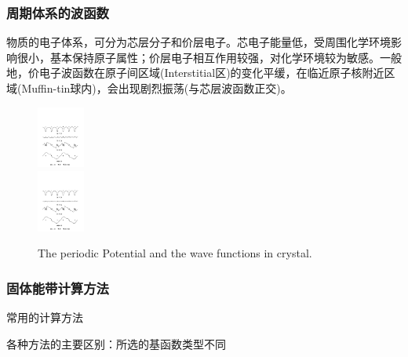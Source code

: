 \documentclass[cjk,slidestop,compress,mathserif,blue]{beamer}
\newcommand{\upcite}[1]{\hspace{0ex}\textsuperscript{\cite{#1}}} %
\begin{document}
\frame
{
\frametitle{周期体系的波函数}
物质的电子体系，可分为芯层分子和价层电子。芯电子能量低，受周围化学环境影响很小，基本保持原子属性；价层电子相互作用较强，对化学环境较为敏感。一般地，价电子波函数在原子间区域(\textrm{Interstitial}区)的变化平缓，在临近原子核附近区域(\textrm{Muffin-tin}球内)，会出现剧烈振荡(与芯层波函数正交)。
\begin{figure}[h!]
\centering
\includegraphics[height=0.8in,width=4.in,viewport=41 433 539 546,clip]{Pseudo_wave.pdf}\\
\includegraphics[height=0.8in,width=4.in,viewport=41 210 539 339,clip]{Pseudo_wave.pdf}
\caption{\small \textrm{The periodic Potential and the wave functions in crystal.}}%
\label{Potential-Wave}
\end{figure}
}

\frame
{
\frametitle{固体能带计算方法}
\vskip 10pt
常用的计算方法
  \vskip 5pt 各种方法的主要区别：所选的基函数类型不同
}
\end{document}
